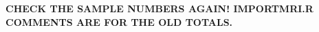 \textbf{CHECK THE SAMPLE NUMBERS AGAIN! IMPORTMRI.R COMMENTS ARE FOR THE OLD TOTALS.}

%
%
%
%

%
%
%
%
%
%
%
%
%

\cite{Yokoyama2007}



